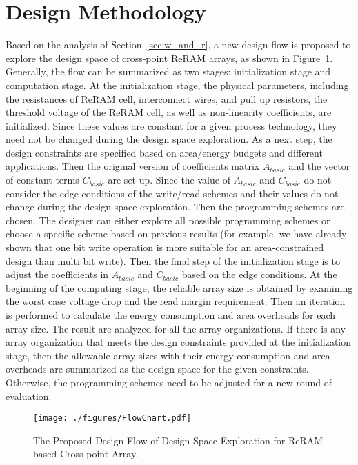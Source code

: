 \vspace{10pt}
\section{Design Methodology}\label{sec:framwork}
Based on the analysis of Section~\ref{sec:w_and_r}, a new design flow is proposed to explore the design space of cross-point ReRAM arrays, as shown in Figure~\ref{fig:FlowChart}. Generally, the flow can be summarized as two stages: initialization stage and computation stage. At the initialization stage, the physical parameters, including the resistances of ReRAM cell, interconnect wires, and pull up resistors, the threshold voltage of the ReRAM cell, as well as non-linearity coefficients, are initialized. Since these values are constant for a given process technology, they need not be changed during the design space exploration. As a next step, the design constraints are specified based on area/energy budgets and different applications. Then the  original version of coefficients matrix $A_{basic}$ and the vector of constant terms $C_{basic}$ are set up. Since the value of $A_{basic}$ and $C_{basic}$ do not consider the edge conditions of the write/read schemes and their values do not change during the design space exploration. Then the programming schemes are chosen. The designer can either explore all possible programming schemes or choose a specific scheme based on previous results (for example, we have already shown that one bit write operation is more suitable for an area-constrained design than multi bit write). Then the final step of the initialization stage is to adjust the coefficients in $A_{basic}$ and $C_{basic}$ based on the edge conditions. At the beginning of the computing stage, the reliable array size is obtained by examining the worst case voltage drop and the read margin requirement. Then an iteration is performed to calculate the energy consumption and area overheads for each array size. The result are analyzed for all the array organizations. If there is any array organization that meets the design constraints provided at  the initialization stage, then the allowable array sizes with their energy consumption and area overheads are summarized as the design space for the given constraints. Otherwise, the programming schemes need to be adjusted for a new round of evaluation.



\begin{figure}[!t]
\centering
  \texttt{[image: ./figures/FlowChart.pdf]}\\
  \caption{The Proposed Design Flow of Design Space Exploration for ReRAM based Cross-point Array.}\label{fig:FlowChart}
  \vspace{-10pt}
\end{figure}
